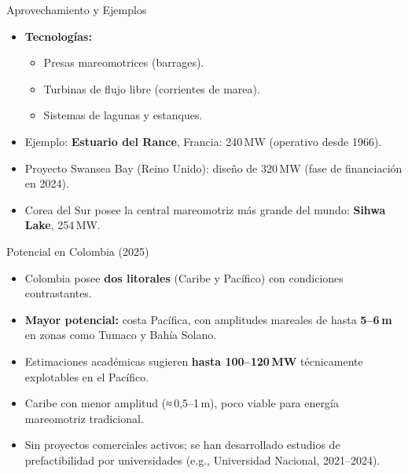 \documentclass[main.tex]{subfiles}
\begin{document}
\begin{frame}{Aprovechamiento y Ejemplos}
    \begin{itemize}
        \item \textbf{Tecnologías:}
        \begin{itemize}
            \item Presas mareomotrices (barrages).
            \item Turbinas de flujo libre (corrientes de marea).
            \item Sistemas de lagunas y estanques.
        \end{itemize}
        \item Ejemplo: \textbf{Estuario del Rance}, Francia: 240 MW (operativo desde 1966).
        \item Proyecto Swansea Bay (Reino Unido): diseño de 320 MW (fase de financiación en 2024).
        \item Corea del Sur posee la central mareomotriz más grande del mundo: \textbf{Sihwa Lake}, 254 MW.
    \end{itemize}
\end{frame}

\begin{frame}{Potencial en Colombia (2025)}
    \begin{itemize}
        \item Colombia posee \textbf{dos litorales} (Caribe y Pacífico) con condiciones contrastantes.
        \item \textbf{Mayor potencial:} costa Pacífica, con amplitudes mareales de hasta \textbf{5–6 m} en zonas como Tumaco y Bahía Solano.
        \item Estimaciones académicas sugieren \textbf{hasta 100–120 MW} técnicamente explotables en el Pacífico.
        \item Caribe con menor amplitud (≈ 0,5–1 m), poco viable para energía mareomotriz tradicional.
        \item Sin proyectos comerciales activos; se han desarrollado estudios de prefactibilidad por universidades (e.g., Universidad Nacional, 2021–2024).
    \end{itemize}
\end{frame}
\end{document}
